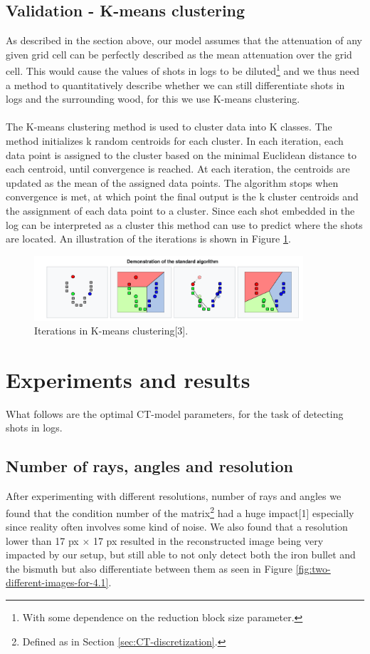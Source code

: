\documentclass{article}
\begin{document}
\subsection{Validation - K-means clustering}
As described in the section above, our model assumes that the attenuation of any given grid cell can be perfectly described as the mean attenuation over the grid cell. This would cause the values of shots in logs to be diluted\footnote{With some dependence on the reduction block size parameter.} and we thus need a method to quantitatively describe whether we can still differentiate shots in logs and the surrounding wood, for this we use K-means clustering. \\\\
The K-means clustering method is used to cluster data into K classes. The method initializes k random centroids for each cluster. In each iteration, each data point is assigned to the cluster based on the minimal Euclidean distance to each centroid, until convergence is reached. At each iteration, the centroids are updated as the mean of the assigned data points. The algorithm stops when convergence is met, at which point the final output is the k cluster centroids and the assignment of each data point to a cluster. Since each shot embedded in the log can be interpreted as a cluster this method can use to predict where the shots are located. An illustration of the iterations is shown in Figure \ref{Kmeans}. 
\begin{figure}[H]
    \centering
    \includegraphics[width=10cm]{images/Kmeans.png}
    \caption[Iterations in K-means clustering]{\small Iterations in K-means clustering[3].}
    \label{Kmeans}
\end{figure}


\section{Experiments and results}
\vspace*{-0.3\baselineskip}
What follows are the optimal CT-model parameters, for the task of detecting shots in logs. 

\subsection{Number of rays, angles and resolution}\label{sec:num-rays-angles-resolution} 
After experimenting with different resolutions, number of rays and angles we found that the condition number of the matrix\footnote{Defined as in Section \ref{sec:CT-discretization}.} had a huge impact[1] especially since reality often involves some kind of noise. 
We also found that a resolution lower than 17 px $\times$ 17 px resulted in the reconstructed image being very impacted by our setup, but still able to not only detect both the iron bullet and the bismuth but also differentiate between them as seen in Figure \ref{fig:two-different-images-for-4.1}. 
\end{document}
